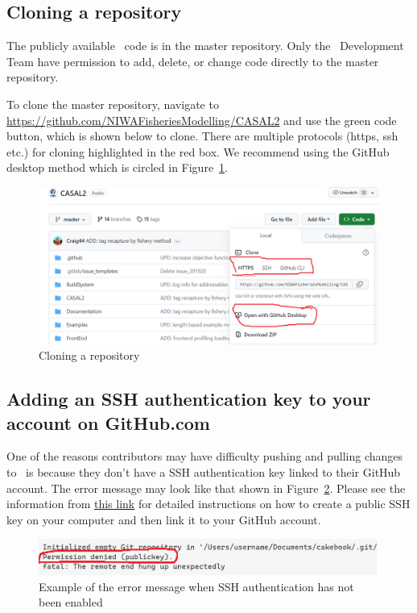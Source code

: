 \subsection{Cloning a repository}

The publicly available \CNAME\ code is in the master repository. Only the \CNAME\ Development Team have permission to add, delete, or change code directly to the master repository. 

To clone the master repository, navigate to \url{https://github.com/NIWAFisheriesModelling/CASAL2} and use the green code button, which is shown below to clone. There are multiple protocols (https, ssh etc.) for cloning highlighted in the red box. We recommend using the GitHub desktop method which is circled in Figure~\ref{fig:clone}.

\begin{figure}[H]
	\centering
	\includegraphics[scale=0.6]{Figures/clone_repo.png}
	\caption{Cloning a repository}\label{fig:clone}
\end{figure}


\subsection{Adding an SSH authentication key to your account on GitHub.com}

One of the reasons contributors may have difficulty pushing and pulling changes to \CNAME\ is because they don't have a SSH authentication key linked to their GitHub account. The error message may look like that shown in Figure~\ref{fig:permissiondenied}. Please see the information from \href{https://docs.github.com/en/authentication/connecting-to-github-with-ssh/adding-a-new-ssh-key-to-your-github-account}{this link} for detailed instructions on how to create a public SSH key on your computer and then link it to your GitHub account.

\begin{figure}[H]
	\centering
	\includegraphics[scale=0.6]{Figures/permissiondenied.png}
	\caption{Example of the error message when SSH authentication has not been enabled}\label{fig:permissiondenied}
\end{figure}
